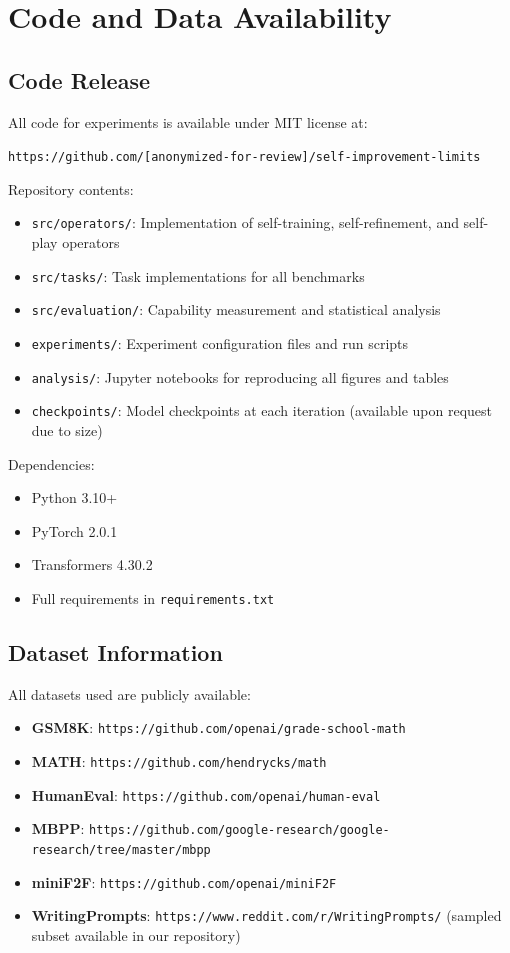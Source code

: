 \documentclass{article}
\theoremstyle{definition}
\theoremstyle{remark}
\begin{document}
\section{Code and Data Availability}
\label{sec:code-data}

\subsection{Code Release}

All code for experiments is available under MIT license at:
\begin{center}
\texttt{https://github.com/[anonymized-for-review]/self-improvement-limits}
\end{center}

Repository contents:
\begin{itemize}
\item \texttt{src/operators/}: Implementation of self-training, self-refinement, and self-play operators
\item \texttt{src/tasks/}: Task implementations for all benchmarks
\item \texttt{src/evaluation/}: Capability measurement and statistical analysis
\item \texttt{experiments/}: Experiment configuration files and run scripts
\item \texttt{analysis/}: Jupyter notebooks for reproducing all figures and tables
\item \texttt{checkpoints/}: Model checkpoints at each iteration (available upon request due to size)
\end{itemize}

Dependencies:
\begin{itemize}
\item Python 3.10+
\item PyTorch 2.0.1
\item Transformers 4.30.2
\item Full requirements in \texttt{requirements.txt}
\end{itemize}

\subsection{Dataset Information}

All datasets used are publicly available:
\begin{itemize}
\item \textbf{GSM8K}: \texttt{https://github.com/openai/grade-school-math}
\item \textbf{MATH}: \texttt{https://github.com/hendrycks/math}
\item \textbf{HumanEval}: \texttt{https://github.com/openai/human-eval}
\item \textbf{MBPP}: \texttt{https://github.com/google-research/google-research/tree/master/mbpp}
\item \textbf{miniF2F}: \texttt{https://github.com/openai/miniF2F}
\item \textbf{WritingPrompts}: \texttt{https://www.reddit.com/r/WritingPrompts/} (sampled subset available in our repository)
\end{itemize}
\end{document}
